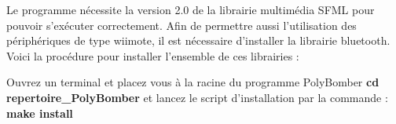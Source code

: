 
	Le programme nécessite la version 2.0 de la librairie multimédia SFML pour pouvoir s'exécuter correctement. Afin de permettre aussi l'utilisation des périphériques de type wiimote, il est nécessaire d'installer la librairie bluetooth. Voici la procédure pour installer l'ensemble de ces librairies :
	
	

Ouvrez un terminal et placez vous à la racine du programme PolyBomber \textbf{cd repertoire\_PolyBomber} et lancez le script d'installation par la commande : \textbf{make install}
